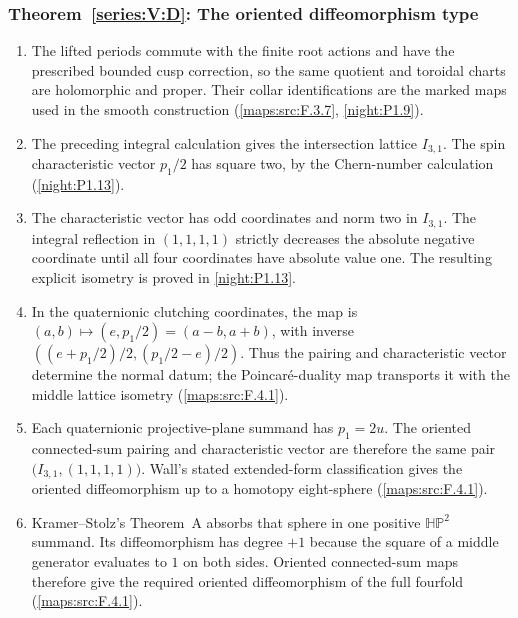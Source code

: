 \subsubsection*{Theorem~\ref{series:V:D}: The oriented diffeomorphism type}
\begin{enumerate}[label=\arabic*.,leftmargin=*]
\item\hypertarget{step-V-D-1}{} The lifted periods commute with the finite root actions and
  have the prescribed bounded cusp correction, so the same quotient
  and toroidal charts are holomorphic and proper.  Their collar
  identifications are the marked maps used in the smooth construction
  (\cref{maps:src:F.3.7}, \cref{night:P1.9}).

\item\hypertarget{step-V-D-2}{} The preceding integral calculation gives the intersection
  lattice $I_{3,1}$.  The spin characteristic vector $p_1/2$ has
  square two, by the Chern-number calculation
  (\cref{night:P1.13}).

\item\hypertarget{step-V-D-3}{} The characteristic vector has odd coordinates and norm two in $I_{3,1}$. The integral reflection in $(1,1,1,1)$ strictly decreases the absolute negative coordinate until all four coordinates have absolute value one. The resulting explicit isometry is proved in \cref{night:P1.13}.

\item\hypertarget{step-V-D-4}{} In the quaternionic clutching coordinates, the map is
  $(a,b)\mapsto(e,p_1/2)=(a-b,a+b)$, with inverse
  $((e+p_1/2)/2,(p_1/2-e)/2)$.  Thus the pairing and characteristic
  vector determine the normal datum; the Poincar\'e-duality map
  transports it with the middle lattice isometry
  (\cref{maps:src:F.4.1}).

\item\hypertarget{step-V-D-5}{} Each quaternionic projective-plane summand has $p_1=2u$.
  The oriented connected-sum pairing and characteristic vector are
  therefore the same pair $\bigl(I_{3,1},(1,1,1,1)\bigr)$.
  Wall's stated extended-form classification gives the oriented
  diffeomorphism up to a homotopy eight-sphere
  (\cref{maps:src:F.4.1}).

\item\hypertarget{step-V-D-6}{} Kramer--Stolz's Theorem~A absorbs that sphere in one positive
  $\mathbb{HP}^2$ summand.  Its diffeomorphism has degree $+1$ because
  the square of a middle generator evaluates to $1$ on both sides.
  Oriented connected-sum maps therefore give the required oriented
  diffeomorphism of the full fourfold
  (\cref{maps:src:F.4.1}).

\end{enumerate}

